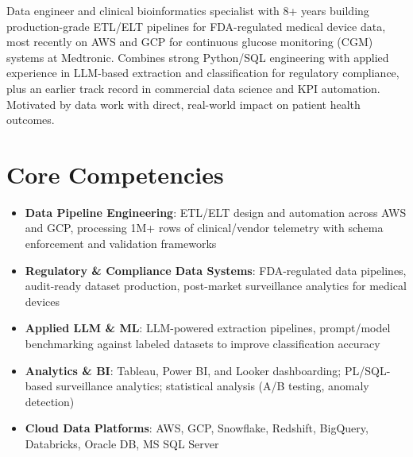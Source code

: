 \documentclass[11pt,a4paper,sans]{moderncv}
\begin{document}
\makecvtitle


\vspace{6pt}
\small{Data engineer and clinical bioinformatics specialist with 8+ years building production-grade ETL/ELT pipelines for FDA-regulated medical device data, most recently on AWS and GCP for continuous glucose monitoring (CGM) systems at Medtronic. Combines strong Python/SQL engineering with applied experience in LLM-based extraction and classification for regulatory compliance, plus an earlier track record in commercial data science and KPI automation. Motivated by data work with direct, real-world impact on patient health outcomes.}


\section{Core Competencies}
\vspace{1pt}
\begin{itemize}

\item \textbf{Data Pipeline Engineering}: ETL/ELT design and automation across AWS and GCP, processing 1M+ rows of clinical/vendor telemetry with schema enforcement and validation frameworks

\item \textbf{Regulatory \& Compliance Data Systems}: FDA-regulated data pipelines, audit-ready dataset production, post-market surveillance analytics for medical devices

\item \textbf{Applied LLM \& ML}: LLM-powered extraction pipelines, prompt/model benchmarking against labeled datasets to improve classification accuracy

\item \textbf{Analytics \& BI}: Tableau, Power BI, and Looker dashboarding; PL/SQL-based surveillance analytics; statistical analysis (A/B testing, anomaly detection)

\item \textbf{Cloud Data Platforms}: AWS, GCP, Snowflake, Redshift, BigQuery, Databricks, Oracle DB, MS SQL Server

\end{itemize}
\end{document}
